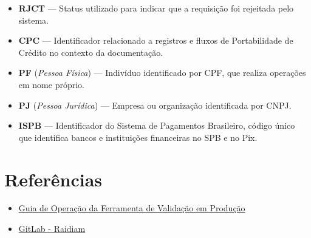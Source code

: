 \begin{itemize}
    \item \textbf{RJCT} — Status utilizado para indicar que a requisição foi rejeitada pelo sistema.
    
    \item \textbf{CPC} — Identificador relacionado a registros e fluxos de Portabilidade de Crédito no contexto da documentação.
    
    \item \textbf{PF} (\textit{Pessoa Física}) — Indivíduo identificado por CPF, que realiza operações em nome próprio.
    
    \item \textbf{PJ} (\textit{Pessoa Jurídica}) — Empresa ou organização identificada por CNPJ.
    
    \item \textbf{ISPB} — Identificador do Sistema de Pagamentos Brasileiro, código único que identifica bancos e instituições financeiras no SPB e no Pix.
\end{itemize}

\section{Referências}

\begin{itemize}
    \item \href{https://openfinancebrasil.atlassian.net/wiki/spaces/OF/pages/553254913/Guia+de+Opera+o+da+Ferramenta+de+Valida+o+em+Produ+o}{Guia de Operação da Ferramenta de Validação em Produção}
    \item \href{https://gitlab.com/raidiam-conformance/open-finance/certification/-/wikis/home}{GitLab - Raidiam}
\end{itemize}

